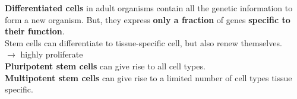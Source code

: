 \textbf{Differentiated cells} in adult organisms contain all the genetic information to form a new organism.
But, they express \textbf{only a fraction} of genes \textbf{specific to their function}.\\

Stem cells can differentiate to tissue-specific cell, but also renew themselves.\\
$\to$ highly proliferate\\

\textbf{Pluripotent stem cells} can give rise to all cell types.\\
\textbf{Multipotent stem cells} can give rise to a limited number of cell types tissue specific.